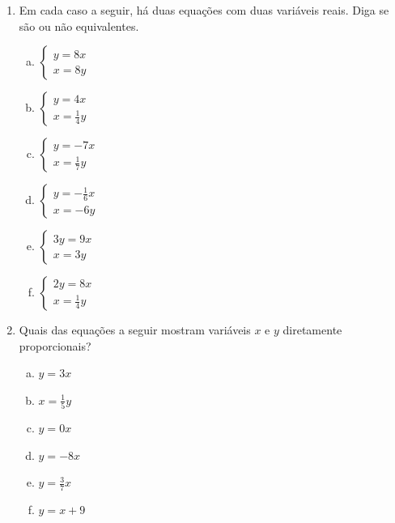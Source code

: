 \documentclass[a4paper,14pt]{article}
\begin{document}
	\begin{multicols}{2}
		\begin{enumerate}
			\item Em cada caso a seguir, há duas equações com duas variáveis reais. Diga se são ou não equivalentes.
			\begin{enumerate}[a)]
				\item
				$\begin{cases}
					y = 8x \\
					x = 8y
				\end{cases}$
				\item
				$\begin{cases}
					y = 4x \\
					x = \frac{1}{4}y
				\end{cases}$
			    \item
			    $\begin{cases}
			    	y = -7x \\
			    	x = \frac{1}{7}y
			    \end{cases}$
		        \item
		        $\begin{cases}
		        	y = -\frac{1}{6}x \\
		        	x = -6y
		        \end{cases}$
	            \item
	            $\begin{cases}
	            	3y = 9x \\
	            	x = 3y
	            \end{cases}$
                \item
                $\begin{cases}
                	2y = 8x \\
                	x = \frac{1}{4}y
                \end{cases}$\\
			\end{enumerate}
			\item Quais das equações a seguir mostram variáveis $x$ e $y$ diretamente proporcionais?
			\begin{enumerate}[a)]
				\item $y = 3x$
				\item $x = \frac{1}{5}y$
				\item $y = 0x$
				\item $y = -8x$
				\item $y = \frac{3}{7}x$
				\item $y = x + 9$

\end{enumerate}
\end{enumerate}
\end{multicols}
\end{document}
